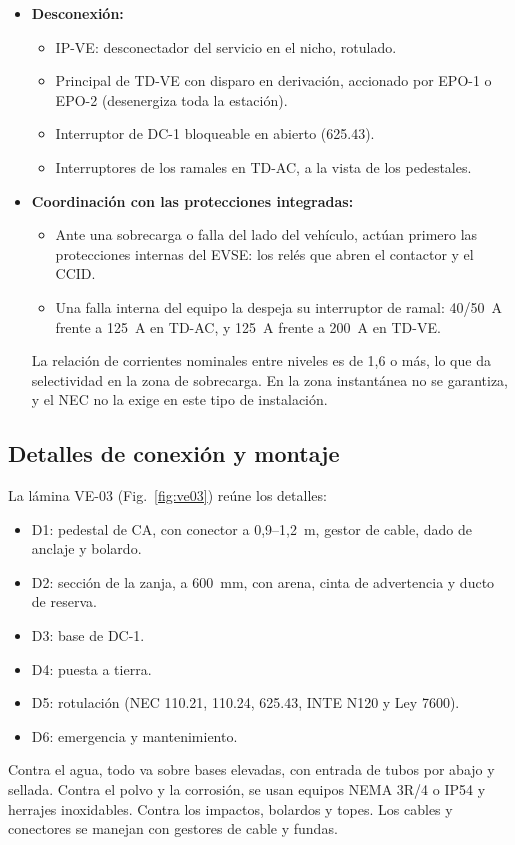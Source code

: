 \begin{itemize}
\item \textbf{Desconexión:}
  \begin{itemize}
  \item IP-VE: desconectador del servicio en el nicho, rotulado.
  \item Principal de TD-VE con disparo en derivación, accionado por EPO-1 o EPO-2 (desenergiza toda la estación).
  \item Interruptor de DC-1 bloqueable en abierto (625.43).
  \item Interruptores de los ramales en TD-AC, a la vista de los pedestales.
  \end{itemize}
\item \textbf{Coordinación con las protecciones integradas:}
  \begin{itemize}
  \item Ante una sobrecarga o falla del lado del vehículo, actúan primero las protecciones internas del EVSE: los relés que abren el contactor y el CCID.
  \item Una falla interna del equipo la despeja su interruptor de ramal: 40/50~A frente a 125~A en TD-AC, y 125~A frente a 200~A en TD-VE.
  \end{itemize}
  La relación de corrientes nominales entre niveles es de 1,6 o más, lo que da selectividad en la zona de sobrecarga. En la zona instantánea no se garantiza, y el NEC no la exige en este tipo de instalación.
\end{itemize}

\subsection{Detalles de conexión y montaje}
La lámina VE-03 (Fig.~\ref{fig:ve03}) reúne los detalles:
\begin{itemize}
\item D1: pedestal de CA, con conector a 0,9--1,2~m, gestor de cable, dado de anclaje y bolardo.
\item D2: sección de la zanja, a 600~mm, con arena, cinta de advertencia y ducto de reserva.
\item D3: base de DC-1.
\item D4: puesta a tierra.
\item D5: rotulación (NEC 110.21, 110.24, 625.43, INTE N120 y Ley 7600).
\item D6: emergencia y mantenimiento.
\end{itemize}
Contra el agua, todo va sobre bases elevadas, con entrada de tubos por abajo y sellada. Contra el polvo y la corrosión, se usan equipos NEMA 3R/4 o IP54 y herrajes inoxidables. Contra los impactos, bolardos y topes. Los cables y conectores se manejan con gestores de cable y fundas.

